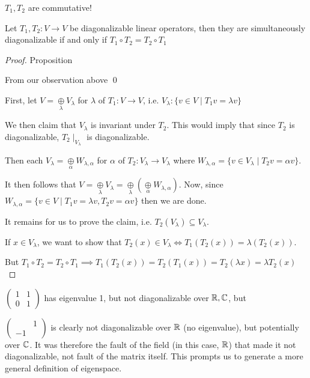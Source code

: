 \(T_1, T_2\) are commutative!

\begin{proposition}
    Let \(T_1, T_2: V \to V\) be diagonalizable linear operators, then they are simultaneously diagonalizable if and only if \(T_1 \circ T_2 = T_2 \circ T_1\)
\end{proposition}

\begin{proof} {Proposition}

    \pffwd From our observation above \qed

    \pfbwd First, let \(V  = \underset{\lambda}{\oplus} V_{\lambda}\) for \(\lambda\) of \(T_1: V \to V\), i.e. \(V_\lambda: \{v \in V \mid T_1 v = \lambda v\}\)

    We then claim that \(V_\lambda\) is invariant under \(T_2\). This would imply that since \(T_2\) is diagonalizable, \(T_2 \mid_{V_\lambda}\) is diagonalizable.

    Then each \(V_\lambda = \underset{\alpha}{\oplus} W_{\lambda, \alpha}\) for \(\alpha\) of \(T_2: V_\lambda \to V_\lambda\) where \(W_{\lambda, \alpha} = \{v \in V_\lambda \mid T_2 v= \alpha v\}\).

    It then follows that \(V = \underset{\lambda}{\oplus} V_{\lambda} = \underset{\lambda}{\oplus} (\underset{\alpha}{\oplus} W_{\lambda, \alpha})\). Now, since \(W_{\lambda, \alpha} = \{v \in V \mid T_1 v = \lambda v, T_2 v = \alpha v\}\) then we are done.

    It remains for us to prove the claim, i.e. \(T_2(V_\lambda) \subseteq V_\lambda\).

    If \(x \in V_\lambda\), we want to show that \(T_2(x) \in V_\lambda \Leftrightarrow T_1(T_2(x))  = \lambda (T_2(x))\).

    But \(T_1 \circ T_2 = T_2 \circ T_1 \implies T_1(T_2(x)) = T_2(T_1(x)) = T_2(\lambda x) = \lambda T_2(x)\)
\end{proof}

\begin{observe}
    \(\begin{pmatrix}
        1 & 1 \\
        0 & 1
    \end{pmatrix}\) has eigenvalue 1, but not diagonalizable over \(\mathbb{R}, \mathbb{C}\), but

    \(\begin{pmatrix}
           & 1 \\
        -1 &
    \end{pmatrix}\) is clearly not diagonalizable over \(\mathbb{R}\) (no eigenvalue), but potentially over \(\mathbb{C}\). It was therefore the fault of the field (in this case, \(\mathbb{R}\)) that made it not diagonalizable, not fault of the matrix itself. This prompts us to generate a more general definition of eigenspace.
\end{observe}

